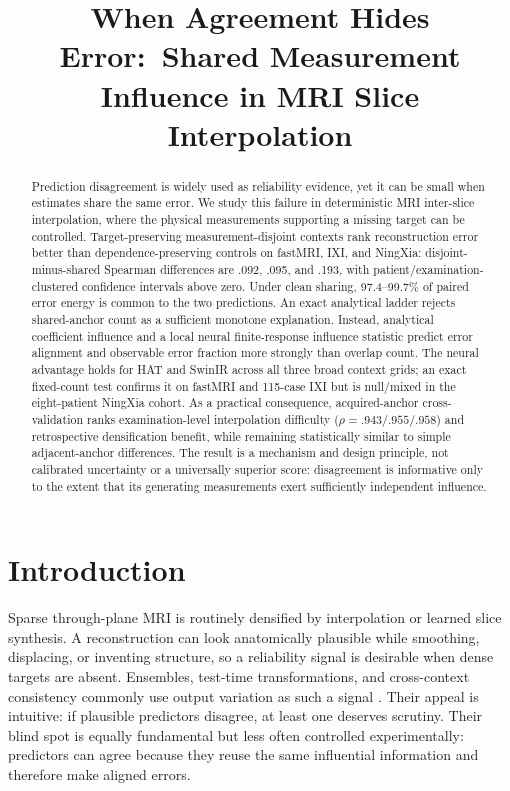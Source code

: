 \documentclass[10pt,twocolumn,letterpaper]{article}
\title{When Agreement Hides Error:\
Shared Measurement Influence in MRI Slice Interpolation}
\begin{document}
\maketitle

\begin{abstract}
Prediction disagreement is widely used as reliability evidence, yet it can be small when estimates share the same error. We study this failure in deterministic MRI inter-slice interpolation, where the physical measurements supporting a missing target can be controlled. Target-preserving measurement-disjoint contexts rank reconstruction error better than dependence-preserving controls on fastMRI, IXI, and NingXia: disjoint-minus-shared Spearman differences are .092, .095, and .193, with patient/examination-clustered confidence intervals above zero. Under clean sharing, 97.4--99.7\% of paired error energy is common to the two predictions. An exact analytical ladder rejects shared-anchor count as a sufficient monotone explanation. Instead, analytical coefficient influence and a local neural finite-response influence statistic predict error alignment and observable error fraction more strongly than overlap count. The neural advantage holds for HAT and SwinIR across all three broad context grids; an exact fixed-count test confirms it on fastMRI and 115-case IXI but is null/mixed in the eight-patient NingXia cohort. As a practical consequence, acquired-anchor cross-validation ranks examination-level interpolation difficulty ($\rho=.943/.955/.958$) and retrospective densification benefit, while remaining statistically similar to simple adjacent-anchor differences. The result is a mechanism and design principle, not calibrated uncertainty or a universally superior score: disagreement is informative only to the extent that its generating measurements exert sufficiently independent influence.
\end{abstract}

\section{Introduction}
Sparse through-plane MRI is routinely densified by interpolation or learned slice synthesis. A reconstruction can look anatomically plausible while smoothing, displacing, or inventing structure, so a reliability signal is desirable when dense targets are absent. Ensembles, test-time transformations, and cross-context consistency commonly use output variation as such a signal \cite{lakshminarayanan2017ensembles,gal2016dropout,edupuganti2021uncertainty}. Their appeal is intuitive: if plausible predictors disagree, at least one deserves scrutiny. Their blind spot is equally fundamental but less often controlled experimentally: predictors can agree because they reuse the same influential information and therefore make aligned errors.
\end{document}
